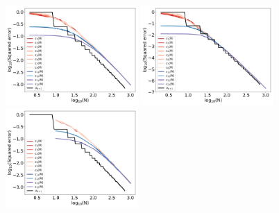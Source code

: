 \documentclass[twoside,11pt]{book}
\numberwithin{theorem}{chapter}
\numberwithin{definition}{chapter}
\numberwithin{proposition}{chapter}
\numberwithin{corollary}{chapter}
\numberwithin{example}{chapter}
\numberwithin{lemma}{chapter}
\begin{document}
\begin{figure}
\centering
\includegraphics[width=0.45\textwidth]{img/neurips/multiSobolev/multig_interpolation_Korobov_s_1_fig_1.pdf}
\includegraphics[width=0.45\textwidth]{img/neurips/multiSobolev/multig_interpolation_Korobov_s_2_fig_1.pdf}\\
\includegraphics[width=0.45\textwidth]{img/neurips/multiSobolev/LVSQ_multig_interpolation_Korobov_s_1_fig_1.pdf}

\end{figure}
\end{document}
